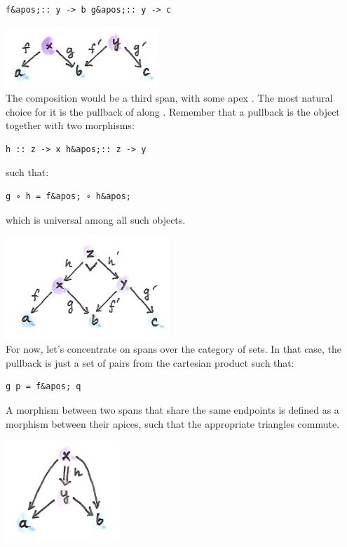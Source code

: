 \begin{verbatim}
f&apos;:: y -> b g&apos;:: y -> c
\end{verbatim}

\includegraphics[width=2.26042in]{images/compspan.png}\\
The composition would be a third span, with some apex . The
most natural choice for it is the pullback of  along
. Remember that a pullback is the object 
together with two morphisms:

\begin{verbatim}
h :: z -> x h&apos;:: z -> y
\end{verbatim}

such that:

\begin{verbatim}
g ∘ h = f&apos; ∘ h&apos;
\end{verbatim}

which is universal among all such objects.

\includegraphics[width=2.42708in]{images/pullspan.png}\\
For now, let's concentrate on spans over the category of sets. In that
case, the pullback is just a set of pairs  from the
cartesian product  such that:

\begin{verbatim}
g p = f&apos; q
\end{verbatim}

A morphism between two spans that share the same endpoints is defined as
a morphism  between their apices, such that the appropriate
triangles commute.

\hypertarget{attachment_9111}{}
\includegraphics[width=1.70833in]{images/morphspan.png}

